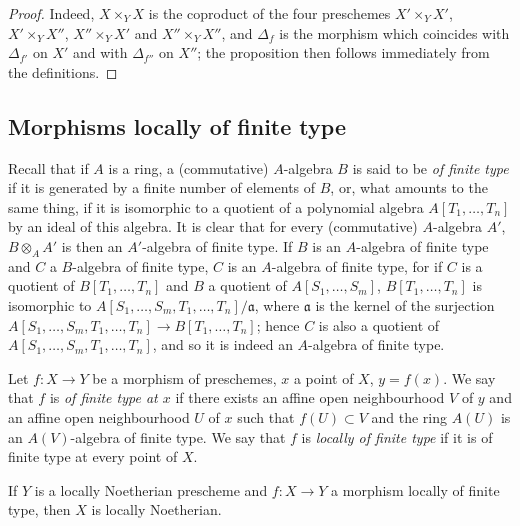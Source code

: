 \begin{proof}
Indeed, $X\times_Y X$ is the coproduct of the four preschemes $X'\times_Y X'$, $X'\times_Y X''$, $X''\times_Y X'$
and $X''\times_Y X''$, and $\Delta_f$ is the morphism which coincides with $\Delta_{f'}$ on $X'$ and with $\Delta_{f''}$ on $X''$;
the proposition then follows immediately from the definitions.
\end{proof}

\subsection{Morphisms locally of finite type}
\label{subsection:IV.1.3}

\begin{env}[1.3.1]
\label{IV.1.3.1}
Recall that if $A$ is a ring, a (commutative) $A$-algebra $B$ is
said to be \emph{of finite type} if it is generated by a finite number of elements of $B$, or, what amounts to
the same thing, if it is isomorphic to a quotient of a polynomial algebra $A[T_1,\ldots,T_n]$
by an ideal of this algebra. It is clear that for every (commutative) $A$-algebra $A'$,
$B\otimes_A A'$ is then an $A'$-algebra of finite type. If $B$ is an $A$-algebra of finite type and $C$
a $B$-algebra of finite type, $C$ is an $A$-algebra of finite type, for if $C$ is a quotient
of $B[T_1,\ldots,T_n]$ and $B$ a quotient of $A[S_1,\ldots,S_m]$, $B[T_1,\ldots,T_n]$ is isomorphic to $A[S_1,\ldots,S_m,T_1,\ldots,T_n]/\mathfrak{a}$,
where $\mathfrak{a}$ is the kernel of the surjection $A[S_1,\ldots,S_m,T_1,\ldots,T_n]\to B[T_1,\ldots,T_n]$; hence $C$ is also a quotient of
$A[S_1,\ldots,S_m,T_1,\ldots,T_n]$, and so it is indeed an $A$-algebra of finite type.
\end{env}

\begin{definition}[1.3.2]
\label{IV.1.3.2}
Let $f:X\to Y$ be a morphism of preschemes, $x$ a point of $X$,
$y=f(x)$. We say that $f$ is \emph{of finite type at $x$} if there exists an affine open neighbourhood $V$ of $y$ and an affine open
neighbourhood $U$ of $x$ such that $f(U)\subset V$ and the ring $A(U)$ is an $A(V)$-algebra of finite type.
We say that $f$ is \emph{locally of finite type} if it is of finite type at every point of $X$.
\end{definition}


\begin{proposition}[1.3.3]
\label{IV.1.3.3}
If $Y$ is a locally Noetherian prescheme and $f:X\to Y$ a
morphism locally of finite type, then $X$ is locally Noetherian.
\end{proposition}

